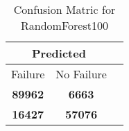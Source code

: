 \begin{table}[] 
\caption{Confusion Matric for RandomForest100} 
\label{Table: Prediction Accuracy-DMDRandomForest100OnlySunEKF-ignoreReflection-Reflection} 
\centering 
\begin{tabular} 
 {@{}ccc@{}} 
\toprule 
\multicolumn{2}{c}{\textbf{Predicted}}
 \\ \midrule 
\multicolumn{1}{|c|}{Failure} & 
\multicolumn{1}{c|}{No Failure}
 \\ \midrule 
\multicolumn{1}{|c|}{\color{green}\textbf{89962}} & 
\multicolumn{1}{c|}{\color{red}\textbf{6663}}
 \\ \midrule 
\multicolumn{1}{|c|}{\color{red}\textbf{16427}} & 
\multicolumn{1}{c|}{\color{green}\textbf{57076}}
 \\ \bottomrule 
\end{tabular} 
\end{table} 

